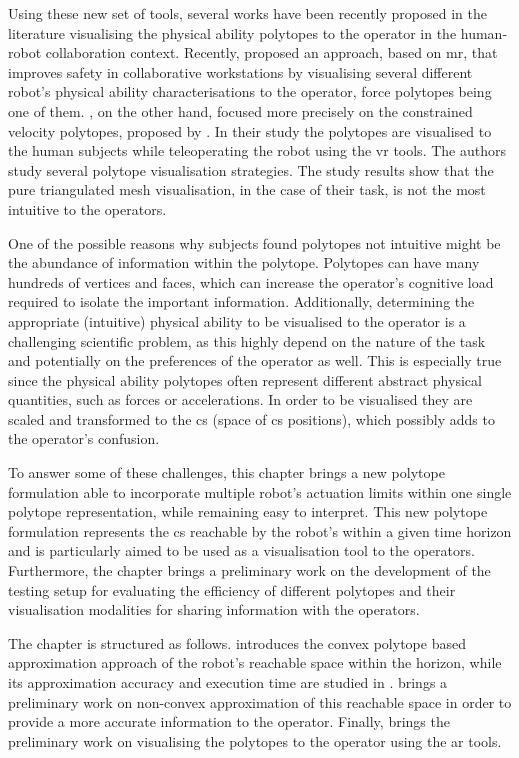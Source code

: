 Using these new set of tools, several works have been recently proposed in the literature visualising the physical ability polytopes to the operator in the human-robot collaboration context. Recently, \citet{Weistroffer2022Using} proposed an approach, based on \gls{mr}, that improves safety in collaborative workstations by visualising several different robot's physical ability characterisations to the operator, force polytopes being one of them. \citet{Zolotas2021}, on the other hand, focused more precisely on the constrained velocity polytopes, proposed by \citet{long_constrained_2020}. In their study the polytopes are visualised to the human subjects while teleoperating the robot using the \gls{vr} tools. The authors study several polytope visualisation strategies. The study results show that the pure triangulated mesh visualisation, in the case of their task, is not the most intuitive to the operators.

One of the possible reasons why subjects found polytopes not intuitive might be the abundance of information within the polytope. Polytopes can have many hundreds of vertices and faces, which can increase the operator's cognitive load required to isolate the important information. 
Additionally, determining the appropriate (intuitive) physical ability to be visualised to the operator is a challenging scientific problem, as this highly depend on the nature of the task and potentially on the preferences of the operator as well. This is especially true since the physical ability polytopes often represent different abstract physical quantities, such as forces or accelerations. In order to be visualised they are scaled and transformed to the \gls{cs} (space of \gls{cs} positions), which possibly adds to the operator's confusion. 

To answer some of these challenges, this chapter brings a new polytope formulation able to incorporate multiple robot's actuation limits within one single polytope representation, while remaining easy to interpret. This new polytope formulation represents the \gls{cs} reachable by the robot's within a given time horizon and is particularly aimed to be used as a visualisation tool to the operators. Furthermore, the chapter brings a preliminary work on the development of the testing setup for evaluating the efficiency of different polytopes and their visualisation modalities for sharing information with the operators. 

The chapter is structured as follows.  introduces the convex polytope based approximation approach of the robot's reachable space within the horizon, while its approximation accuracy and execution time are studied in .  brings a preliminary work on non-convex approximation of this reachable space in order to provide a more accurate information to the operator. Finally,  brings the preliminary work on visualising the polytopes to the operator using the \gls{ar} tools. 

